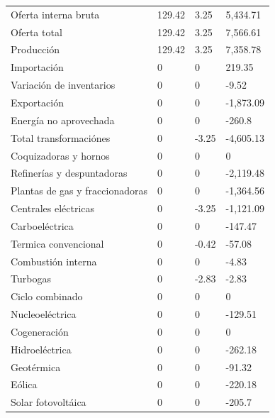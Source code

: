 \documentclass{sener2025}
\begin{document}
\begin{tabladoradoLargo}
\begin{xltabular}{\textwidth}{YZZZ}
    Oferta interna bruta & 129.42 & 3.25 & 5,434.71 \\
    \hspace{1.35em} Oferta total & 129.42 & 3.25 & 7,566.61 \\
    \hspace{2.7em} Producción & 129.42 & 3.25 & 7,358.78 \\
    \hspace{2.7em} Importación & 0 & 0 & 219.35 \\
    \hspace{2.7em} Variación de inventarios & 0 & 0 & -9.52 \\
    \hspace{1.35em} Exportación & 0 & 0 & -1,873.09 \\
    \hspace{1.35em} Energía no aprovechada & 0 & 0 & -260.8 \\
    Total transformaciónes & 0 & -3.25 & -4,605.13 \\
    \hspace{1.35em} Coquizadoras y hornos & 0 & 0 & 0 \\
    \hspace{1.35em} Refinerías y despuntadoras & 0 & 0 & -2,119.48 \\
    \hspace{1.35em} Plantas de gas y fraccionadoras & 0 & 0 & -1,364.56 \\
    \hspace{1.35em} Centrales eléctricas & 0 & -3.25 & -1,121.09 \\
    \hspace{2.7em} Carboeléctrica & 0 & 0 & -147.47 \\
    \hspace{2.7em} Termica convencional & 0 & -0.42 & -57.08 \\
    \hspace{2.7em} Combustión interna & 0 & 0 & -4.83 \\
    \hspace{2.7em} Turbogas & 0 & -2.83 & -2.83 \\
    \hspace{2.7em} Ciclo combinado & 0 & 0 & 0 \\
    \hspace{2.7em} Nucleoeléctrica & 0 & 0 & -129.51 \\
    \hspace{2.7em} Cogeneración & 0 & 0 & 0 \\
    \hspace{2.7em} Hidroeléctrica & 0 & 0 & -262.18 \\
    \hspace{2.7em} Geotérmica & 0 & 0 & -91.32 \\
    \hspace{2.7em} Eólica & 0 & 0 & -220.18 \\
    \hspace{2.7em} Solar fotovoltáica & 0 & 0 & -205.7 \\
  \end{xltabular}
\end{tabladoradoLargo}
\end{document}
